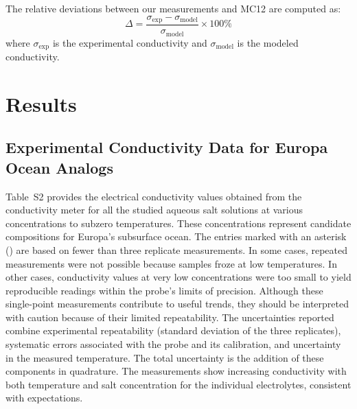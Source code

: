 \documentclass[journal=aesccq,manuscript=article]{achemso}
\begin{document}
The relative deviations between our measurements and MC12 are computed as:
\begin{equation}\label{eqn:Delta}
\Delta = \frac{\sigma_{\mathrm{exp}} - \sigma_{\mathrm{model}}}{\sigma_{\mathrm{model}}} \times 100\%
\end{equation}
where $\sigma_{\mathrm{exp}}$ is the experimental conductivity and $\sigma_{\mathrm{model}}$ is the modeled conductivity.


\section{Results}

\subsection{Experimental Conductivity Data for Europa Ocean Analogs}  

Table~S2 provides the electrical conductivity values obtained from the conductivity meter for all the studied aqueous salt solutions at various concentrations to subzero temperatures. 
These concentrations represent candidate compositions for Europa's subsurface ocean. 
The entries marked with an asterisk (\textasteriskcentered) are based on fewer than three replicate measurements. 
In some cases, repeated measurements were not possible because samples froze at low temperatures. 
In other cases, conductivity values at very low concentrations were too small to yield reproducible readings within the probe's limits of precision. 
Although these single-point measurements contribute to useful trends, they should be interpreted with caution because of their limited repeatability.
The uncertainties reported combine experimental repeatability (standard deviation of the three replicates), systematic errors associated with the probe and its calibration, and uncertainty in the measured temperature. 
The total uncertainty is the addition of these components in quadrature.
The measurements show increasing conductivity with both temperature and salt concentration for the individual electrolytes, consistent with expectations.
\end{document}
